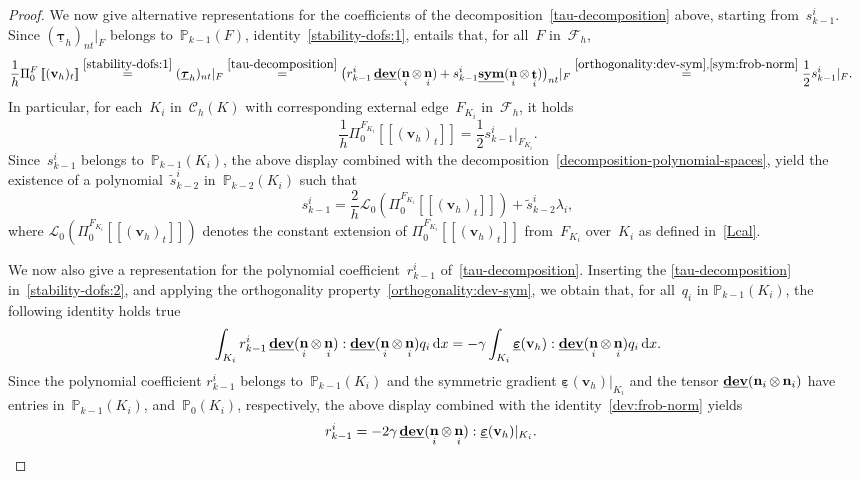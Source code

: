 \documentclass[a4paper,twoside,10pt]{article}
\theoremstyle{plain}
\theoremstyle{remark}
\theoremstyle{definition}
\numberwithin{equation}{section}
\numberwithin{figure}{section}
\newcommand{\jump}[1]{\left[\!\left[#1\right]\!\right]}
\newcommand{\Pbb}{\mathbb{P}}
\newcommand{\Pbbkmo}{\mathbb{P}_{k-1}}
\newcommand{\Pbbkmt}{\mathbb{P}_{k-2}}
\newcommand{\Ccalh}{\mathcal{C}_h}
\newcommand{\K}{K}
\newcommand{\F}{F}
\newcommand{\taubfh}{\underline{\boldsymbol{\tau}}_h}
\newcommand{\vbfh}{\mathbf{v}_h}
\DeclareMathOperator{\dev}{\underline{\mathbf{dev}}}
\newcommand{\normtang}{{nt}}
\newcommand{\sym}{\underline{\bf{sym}}}
\DeclareMathOperator{\norm}{\bf{n}}
\DeclareMathOperator{\tang}{\bf{t}}
\newcommand{\tangscalar}{t}
\newcommand{\Fcalh}{\mathcal{F}_h}
\newcommand{\dx}{\, \mathrm{d}x}
\newcommand{\epsbfun}{\underline{\boldsymbol{\varepsilon}}}
\newcommand{\CcalhK}{\Ccalh(\K)}
\newcommand{\stildekmt}{\widetilde{s}_{k-2}}
\newcommand{\stildekmti}{\stildekmt^i}
\newcommand{\lambdai}{\lambda_i}
\newcommand{\rkmoi}{r_{k-1}^i}
\newcommand{\skmoi}{s_{k-1}^i}
\newcommand{\Ki}{{\K_i}}
\newcommand{\Fi}{{\F_{\Ki}}}
\newcommand{\normi}{\norm_i}
\newcommand{\tangi}{\tang_i}
\newcommand{\PizF}{\Pi_0^{\F}}
\newcommand{\PizFi}{\Pi_0^{\Fi}}
\newcommand{\Lcalzero}{\mathcal{L}_0}
\newcommand{\Pbbz}{\Pbb_0}
\newcommand{\qi}{q_{i}}
\begin{document}
\begin{proof}
We now give alternative representations
for the coefficients of the decomposition~\eqref{tau-decomposition} above,
starting from~$\skmoi$.
Since $(\taubfh)_{\normtang}|_{\F}$
belongs to~$\Pbbkmo(\F)$,
identity~\eqref{stability-dofs:1},
entails that,
for all~$\F$ in~$\Fcalh$,
\begin{equation*}
\begin{split}
\frac{1}{h}\PizF\jump{(\vbfh)_{\tangscalar}}
\overset{\eqref{stability-dofs:1}}{=}
(\taubfh)_{\normtang}|_{\F} 
&\overset{\eqref{tau-decomposition}}{=}
\big(\rkmoi\dev(\normi\otimes\normi) + \skmoi\sym(\normi\otimes\tangi)\big)_{\normtang}|_{\F} 
\overset{\eqref{orthogonality:dev-sym},\eqref{sym:frob-norm}}{=}
\frac{1}{2}\skmoi|_{\F}.
\end{split}
\end{equation*}
In particular,
for each~$\Ki$ in~$\CcalhK$
with corresponding external edge~$\Fi$ in~$\Fcalh$,
it holds
\begin{equation}  \label{skmoi-value-on-edge}
\frac{1}{h}\PizFi\jump{(\vbfh)_{\tangscalar}}
= \frac{1}{2}\skmoi|_{\Fi}.
\end{equation}
Since~$\skmoi$ belongs to~$\Pbbkmo(\Ki)$,
the above display combined with the decomposition~\eqref{decomposition-polynomial-spaces},
yield the existence of a polynomial~$\stildekmti$ in~$\Pbbkmt(\Ki)$
such that
\begin{equation} \label{skmoi-stildekmti}
\skmoi = \frac{2}{h}\Lcalzero(\PizFi\jump{(\vbfh)_{\tangscalar}}) + \stildekmti\lambdai,
\end{equation}
where
$\Lcalzero(\PizFi\jump{(\vbfh)_{\tangscalar}})$ denotes
the constant extension of $\PizFi\jump{(\vbfh)_{\tangscalar}}$ from~$\Fi$ over~$\Ki$
as defined in~\eqref{Lcal}.

We now also give a representation for the polynomial coefficient~$\rkmoi$ of~\eqref{tau-decomposition}.
Inserting the \eqref{tau-decomposition}
in~\eqref{stability-dofs:2},
and applying the orthogonality property~\eqref{orthogonality:dev-sym},
we obtain that,
for all~$\qi$ in $\Pbbkmo(\Ki)$,
the following identity holds true
\begin{equation*} \label{rkmoi-integral-value}
\int_{\Ki} \rkmoi \dev(\normi\otimes\normi) : \dev(\normi\otimes\normi) \qi \dx = - \gamma\int_{\Ki} \epsbfun(\vbfh) : \dev(\normi\otimes\normi) \qi \dx.
\end{equation*}
Since the polynomial coefficient $\rkmoi$
belongs to~$\Pbbkmo(\Ki)$
and the symmetric gradient $\epsbfun(\vbfh)|_{\Ki}$
and the tensor $\dev(\normi\otimes\normi)$
have entries in~$\Pbbkmo(\Ki)$, and~$\Pbbz(\Ki)$,
respectively,
the above display
combined with the identity~\eqref{dev:frob-norm}
yields
\begin{equation} \label{rkmoi-value}
\begin{split}
\rkmoi
&= -2\gamma \dev(\normi\otimes\normi) : \epsbfun(\vbfh)|_{\Ki}.
\end{split}
\end{equation}


\end{proof}
\end{document}
